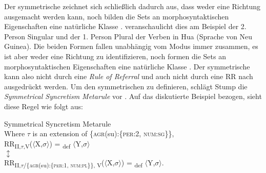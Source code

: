 \begin{exe}
\begin{exe}
Der symmetrische  zeichnet sich schließlich dadurch aus, dass weder eine Richtung ausgemacht werden kann, noch bilden die Sets an morphosyntaktischen Eigenschaften eine natürliche Klasse \citep[216]{Stump2001}. \citet{Stump2001} veranschaulicht dies am Beispiel der 2. Person Singular und der 1. Person Plural der Verben in Hua (Sprache von Neu Guinea). Die beiden Formen fallen unabhängig vom Modus immer zusammen, es ist aber weder eine Richtung zu identifizieren, noch formen die Sets an morphosyntaktischen Eigenschaften eine natürliche Klasse \citep[216–217]{Stump2001}. Der symmetrische  kann also nicht durch eine \textit{Rule of Referral} und auch nicht durch eine RR nach  ausgedrückt werden. Um den symmetrischen  zu definieren, schlägt Stump die \textit{Symmetrical Syncretism Metarule} vor \citep[222]{Stump2001}. Auf das diskutierte Beispiel bezogen, sieht diese Regel wie folgt aus:

\ea%
    \label{ex:key:31}
Symmetrical Syncretism Metarule\\
Where $\tau $ is an extension of \{\textsc{agr}(su):\{\textsc{per:2}, \textsc{num:sg}\}\},\\
RR\textsubscript{II,}\textsubscript{$\tau $}\textsubscript{,V}($\langle$X,$\sigma$$\rangle$) = \textsubscript{def} $\langle$Y,$\sigma$$\rangle$\\
$\updownarrow $\\
RR\textsubscript{II,}\textsubscript{$\tau $}\textsubscript{/\{\textsc{agr}(su):\{\textsc{per:1}, \textsc{num:pl}\}\}, V}($\langle$X,$\sigma$$\rangle$) = \textsubscript{def} $\langle$Y,$\sigma$$\rangle$. \citep[223]{Stump2001}
\z


\end{exe}
\end{exe}
